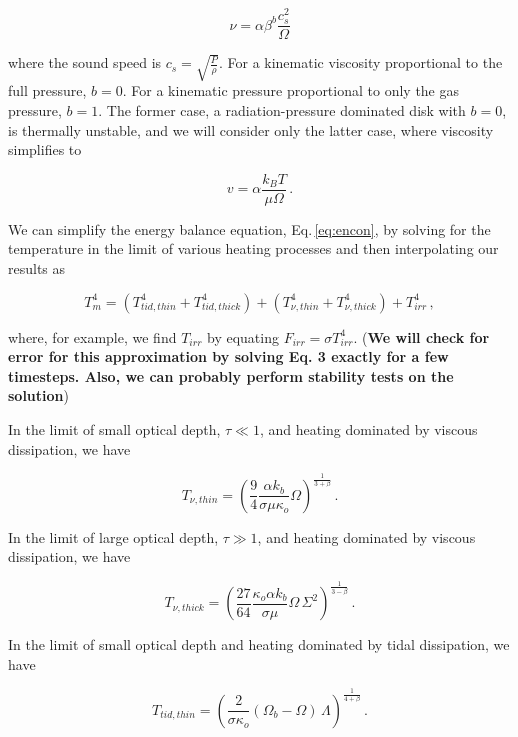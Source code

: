 \documentclass{article}
\begin{document}
\begin{equation}
\nu = \alpha \beta^b \frac{c_s^2}{\Omega}
\end{equation}

where the sound speed is $c_s = \sqrt{\frac{P}{\rho}}$. For a kinematic viscosity proportional to the full pressure, $b = 0$. For a kinematic pressure proportional to only the gas pressure, $b = 1$. The former case, a radiation-pressure dominated disk with $b = 0$, is thermally unstable, and we will consider only the latter case, where viscosity simplifies to

\begin{equation}
v = 	\alpha \frac{k_B T}{\mu \Omega}\,.
\end{equation}

We can simplify the energy balance equation, Eq.\,\ref{eq:encon}, by solving for the temperature in the limit of various heating processes and then interpolating our results as

\begin{equation}
T_m^4 = \left(T_{tid,thin}^4 + T_{tid, thick}^4\right)  + \left(T_{\nu,thin}^4 + T_{\nu,thick}^4\right) + T_{irr}^4\,,
\end{equation}

where, for example, we find $T_{irr}$ by equating $F_{irr} = \sigma T_{irr}^4$. (\textbf{We will check for error for this approximation by solving Eq. 3 exactly for a few timesteps. Also, we can probably perform stability tests on the solution})

In the limit of small optical depth, $\tau \ll 1$, and heating dominated by viscous dissipation, we have

\begin{equation}
T _{\nu,thin} = \left(\frac{9}{4} \frac{\alpha k_b}{\sigma \mu \kappa_o}\Omega \right)^\frac{1}{3+\beta}\,.
\end{equation}

In the limit of large optical depth, $\tau \gg 1$, and heating dominated by viscous dissipation, we have

\begin{equation}
T_{\nu,thick}= \left(\frac{27}{64} \frac{\kappa_o \alpha k_b}{\sigma \mu} \Omega\,\Sigma^2\right)^\frac{1}{3-\beta}\,.
\end{equation}

In the limit of small optical depth and heating dominated by tidal dissipation, we have

\begin{equation}
T_{tid,thin} = \left(\frac{2}{\sigma \kappa_o}(\Omega_b - \Omega)\, \Lambda \right)^\frac{1}{4+\beta}\,.
\end{equation}
\end{document}
